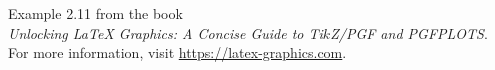 \documentclass{article}
\begin{document}
Example 2.11 from the book\\
\emph{Unlocking LaTeX Graphics: A Concise Guide to Ti$k$Z/PGF and PGFPLOTS}.\\
For more information, visit \url{https://latex-graphics.com}.
\par\bigskip

\end{document}
